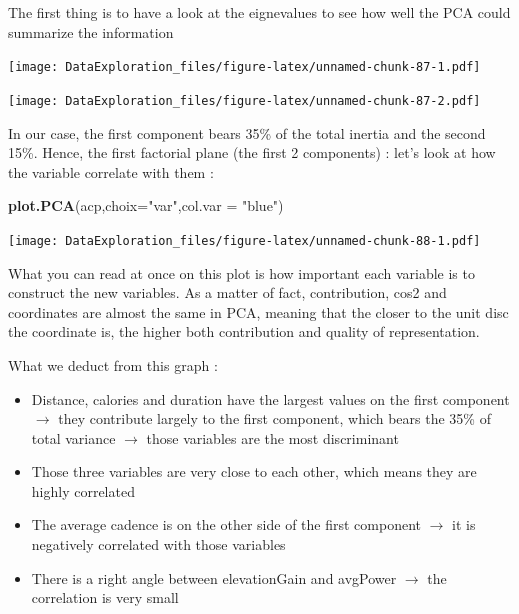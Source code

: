 \documentclass[
]{book}
\newenvironment{Shaded}{\begin{snugshade}}{\end{snugshade}}
\newcommand{\DataTypeTok}[1]{\textcolor[rgb]{0.13,0.29,0.53}{#1}}
\newcommand{\DecValTok}[1]{\textcolor[rgb]{0.00,0.00,0.81}{#1}}
\newcommand{\KeywordTok}[1]{\textcolor[rgb]{0.13,0.29,0.53}{\textbf{#1}}}
\newcommand{\NormalTok}[1]{#1}
\newcommand{\OperatorTok}[1]{\textcolor[rgb]{0.81,0.36,0.00}{\textbf{#1}}}
\newcommand{\StringTok}[1]{\textcolor[rgb]{0.31,0.60,0.02}{#1}}
\providecommand{\tightlist}{%
  \setlength{\itemsep}{0pt}\setlength{\parskip}{0pt}}
\begin{document}
The first thing is to have a look at the eignevalues to see how well the PCA could summarize the information

\begin{Shaded}
\end{Shaded}

\texttt{[image: DataExploration\_files/figure-latex/unnamed-chunk-87-1.pdf]}

\begin{Shaded}
\end{Shaded}

\texttt{[image: DataExploration\_files/figure-latex/unnamed-chunk-87-2.pdf]}

In our case, the first component bears 35\% of the total inertia and the second 15\%. Hence, the first factorial plane (the first 2 components) : let's look at how the variable correlate with them :

\begin{Shaded}
\begin{Highlighting}[]
\KeywordTok{plot.PCA}\NormalTok{(acp,}\DataTypeTok{choix=}\StringTok{"var"}\NormalTok{,}\DataTypeTok{col.var =} \StringTok{"blue"}\NormalTok{)}
\end{Highlighting}
\end{Shaded}

\texttt{[image: DataExploration\_files/figure-latex/unnamed-chunk-88-1.pdf]}

What you can read at once on this plot is how important each variable is to construct the new variables. As a matter of fact, contribution, cos2 and coordinates are almost the same in PCA, meaning that the closer to the unit disc the coordinate is, the higher both contribution and quality of representation.

What we deduct from this graph :

\begin{itemize}
\tightlist
\item
  Distance, calories and duration have the largest values on the first component \(\rightarrow\) they contribute largely to the first component, which bears the 35\% of total variance \(\rightarrow\) those variables are the most discriminant
\item
  Those three variables are very close to each other, which means they are highly correlated
\item
  The average cadence is on the other side of the first component \(\rightarrow\) it is negatively correlated with those variables
\item
  There is a right angle between elevationGain and avgPower \(\rightarrow\) the correlation is very small
\end{itemize}
\end{document}
